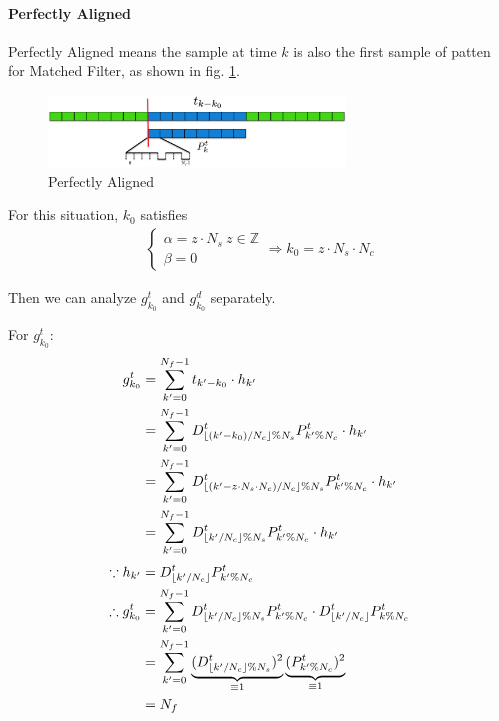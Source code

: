 \documentclass[a4paper]{article}
\DeclarePairedDelimiter\floor{\lfloor}{\rfloor}
\begin{document}
\paragraph{Perfectly Aligned} %
\label{par:perfectly_aligned}
Perfectly Aligned means the sample at time $k$ is also the first sample of patten for Matched Filter, as shown in fig. \ref{fig:Perfectly Aligned}.
\begin{figure}[ht]
	\centering
	\includegraphics[width=3.1in]{figure/perfectly_aligned.png}
	\caption{Perfectly Aligned}
	\label{fig:Perfectly Aligned}
\end{figure}
For this situation, $k_0$ satisfies 
\begin{align}
	\begin{cases}
		\alpha = z \cdot N_s ~ z \in \mathbb{Z}\\
		\beta = 0
	\end{cases}
	\Rightarrow
	k_0 = z \cdot N_s \cdot N_c
\end{align}

Then we can analyze $g^t_{k_0}$ and $g^d_{k_0}$ separately.

For $g^t_{k_0}$: \label{eq:perfectly aligned-training}
\begin{align}
	g^t_{k_0}
	&= \sum_{k' = 0}^{N_f-1} t_{k'-k_0} \cdot h_{k'}\\
	&= \sum_{k' = 0}^{N_f-1} D^t_{\floor{(k'-k_0) / N_c}\%N_s} P^t_{k' \% N_c} \cdot h_{k'}\\
	&= \sum_{k' = 0}^{N_f-1} D^t_{\floor{(k'-z \cdot N_s \cdot N_c) /N_c}\% N_s} P^t_{k' \% N_c} \cdot h_{k'}\\
	&= \sum_{k' = 0}^{N_f-1} D^t_{\floor{k'/N_c}\%N_s} P^t_{k' \% N_c} \cdot h_{k'}\\
\end{align}
\begin{align}
	\because 
	h_{k'} &= D^t_{\floor{k'/N_c}} P^t_{k' \% N_c}\\
	\therefore
	g^t_{k_0}
	&= \sum_{k' = 0}^{N_f-1} D^t_{\floor{k'/N_c}\%N_s} P^t_{k' \% N_c} \cdot D^t_{\floor{k'/N_c}} P^t_{k \% N_c} \\
	&= \sum_{k' = 0}^{N_f-1} \underbrace{(D^t_{\floor{k'/N_c}\%N_s})^2}_{\equiv 1} \underbrace{(P^t_{k' \% N_c})^2}_{\equiv1}\\
	&= N_f
\end{align}
\end{document}
